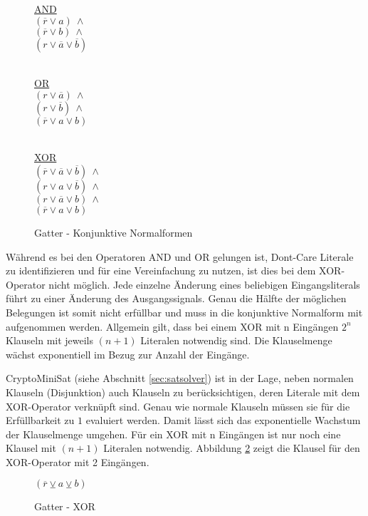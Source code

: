 \begin{figure}[!h]
  \centering
  \begin{minipage}[l]{4.65cm}
    \underline{AND}\\
    $ (\overline{r} \vee a) ~ \wedge $\\
    $ (\overline{r} \vee b) ~ \wedge $\\
    $ (r \vee \overline{a} \vee \overline{b}) $\\
    ~
  \end{minipage}
  \begin{minipage}[l]{4.65cm}
    \underline{OR}\\
    $ (r \vee \overline{a}) ~ \wedge $\\
    $ (r \vee \overline{b}) ~ \wedge $\\
    $ (\overline{r} \vee a \vee b) $\\
    ~
  \end{minipage}
  \begin{minipage}[l]{4.3cm}
    \underline{XOR}\\
    $ (\overline{r} \vee \overline{a} \vee \overline{b}) ~ \wedge $\\
    $ (r \vee a \vee \overline{b}) ~ \wedge $\\
    $ (r \vee \overline{a} \vee b) ~ \wedge $\\
    $ (\overline{r} \vee a \vee b) $
  \end{minipage}
  \caption{Gatter - Konjunktive Normalformen}
  \label{fig:gatter_cnf}
\end{figure}

Während es bei den Operatoren AND und OR gelungen ist, Dont-Care Literale zu identifizieren und für eine Vereinfachung zu nutzen, ist dies bei dem XOR-Operator
nicht möglich. Jede einzelne Änderung eines beliebigen Eingangsliterals führt zu einer Änderung des Ausgangssignals. Genau die Hälfte der möglichen Belegungen
ist somit nicht erfüllbar und muss in die konjunktive Normalform mit aufgenommen werden. Allgemein gilt, dass bei einem XOR mit n Eingängen $ 2^{n} $ Klauseln
mit jeweils $ (n + 1) $ Literalen notwendig sind. Die Klauselmenge wächst exponentiell im Bezug zur Anzahl der Eingänge.

CryptoMiniSat (siehe Abschnitt \ref{sec:satsolver}) ist in der Lage, neben normalen Klauseln (Disjunktion) auch Klauseln zu berücksichtigen, deren Literale
mit dem XOR-Operator verknüpft sind. Genau wie normale Klauseln müssen sie für die Erfüllbarkeit zu $1$ evaluiert werden. Damit lässt sich das exponentielle
Wachstum der Klauselmenge umgehen. Für ein XOR mit n Eingängen ist nur noch eine Klausel mit $ (n + 1) $ Literalen notwendig. Abbildung \ref{fig:gatter_cnf_xor}
zeigt die Klausel für den XOR-Operator mit 2 Eingängen.
\begin{figure}[!h]
  \centering
  $ (\overline{r} \veebar a \veebar b) $\\
  \caption{Gatter - XOR}
  \label{fig:gatter_cnf_xor}
\end{figure}